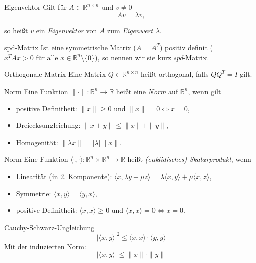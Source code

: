 
\begin{flashcard}[Definition]{Eigenvektor}
Gilt für $A \in \mathbb{R}^{n \times n}$ und $v \neq 0$
$$
	A v = \lambda v,
$$

so heißt $v$ ein \emph{Eigenvektor} von $A$ zum \emph{Eigenwert} $\lambda$. 
\end{flashcard}

\begin{flashcard}[Definition]{spd-Matrix}
	Ist eine symmetrische Matrix ($A = A^T$) positiv definit ($x^T A x > 0 \text{ für alle } x \in \mathbb{R}^n\setminus\{0\}$), so nennen wir sie kurz \emph{spd}-Matrix.
\end{flashcard}

\begin{flashcard}[Definition]{Orthogonale Matrix}
	Eine Matrix $Q \in \mathbb{R}^{n \times n}$ heißt orthogonal, falls $QQ^T = I$ gilt.
\end{flashcard}

\begin{flashcard}[Definition]{Norm}
	Eine Funktion $\|\cdot\| : \mathbb{R}^n \rightarrow \mathbb{R}$ heißt eine \emph{Norm} auf $\mathbb{R}^n$, wenn gilt
	\begin{itemize}
		\item positive Definitheit: $\|x\| \geq 0$ und $\|x\| = 0 \Leftrightarrow x = 0$,
		\item Dreiecksungleichung: $ \| x + y \| \leq \|x\| + \|y\|$,
		\item Homogenität: $\|\lambda x\| = |\lambda|\|x\|$.
	\end{itemize}
\end{flashcard}

\begin{flashcard}[Definition]{Norm}
	Eine Funktion $\langle \cdot, \cdot \rangle : \mathbb{R}^n \times \mathbb{R}^n \rightarrow \mathbb{R}$ heißt \emph{(euklidisches) Skalarprodukt}, wenn
	\begin{itemize}
		\item Linearität (in 2. Komponente): $\langle x, \lambda y + \mu z \rangle = \lambda \langle x, y \rangle + \mu \langle x, z \rangle$,
		\item Symmetrie: $\langle x, y\rangle = \langle y, x \rangle$,
		\item positive Definitheit: $\langle x, x \rangle \geq 0$ und $\langle x, x \rangle = 0 \Leftrightarrow x = 0$.
	\end{itemize}
\end{flashcard}

\begin{flashcard}[Satz]{Cauchy-Schwarz-Ungleichung}
	$$|\langle x, y \rangle|^2 \leq \langle x, x \rangle \cdot \langle y, y \rangle$$
	Mit der induzierten Norm:
	$$ |\langle x, y \rangle| \leq \|x\| \cdot \|y\| $$
\end{flashcard}

